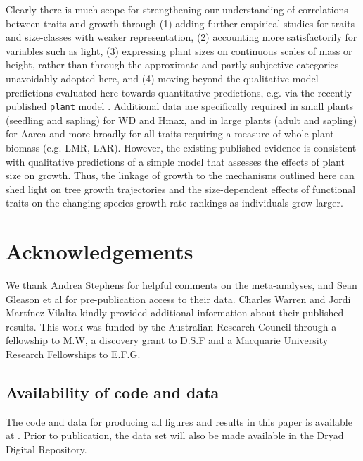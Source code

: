 \documentclass[a4paper,11pt]{article}
\begin{document}
Clearly there is much scope for strengthening our understanding of correlations between traits and growth through (1) adding further empirical studies for traits and size-classes with weaker representation, (2) accounting more satisfactorily for variables such as light, (3) expressing plant sizes on continuous scales of mass or height, rather than through the approximate and partly subjective categories unavoidably adopted here, and (4) moving beyond the qualitative model predictions evaluated here towards quantitative predictions, e.g. via the recently published \texttt{plant} model \citep{Falster-2016}. Additional data are specifically required in small plants (seedling and sapling) for WD and Hmax, and in large plants (adult and sapling) for Aarea and more broadly for all traits requiring a measure of whole plant biomass (e.g. LMR, LAR). However, the existing published evidence is consistent with qualitative predictions of a simple model that assesses the effects of plant size on growth. Thus, the linkage of growth to the mechanisms outlined here can shed light on tree growth trajectories and the size-dependent effects of functional traits on the changing species growth rate rankings as individuals grow larger.

\section*{Acknowledgements}\label{Acknowledgment}

We thank Andrea Stephens for helpful comments on the meta-analyses, and Sean Gleason et al for pre-publication access to their data. Charles Warren and Jordi Mart{\'i}nez-Vilalta kindly provided additional information about their published results. This work was funded by the Australian Research Council through a fellowship to M.W, a discovery grant to D.S.F and a Macquarie University Research Fellowships to E.F.G.

\subsection*{Availability of code and data}\label{code}

The code and data for producing all figures and results in this paper is available at . Prior to publication, the data set will also be made available in the Dryad Digital Repository.

\linespread{1}
\label{references}
\end{document}
